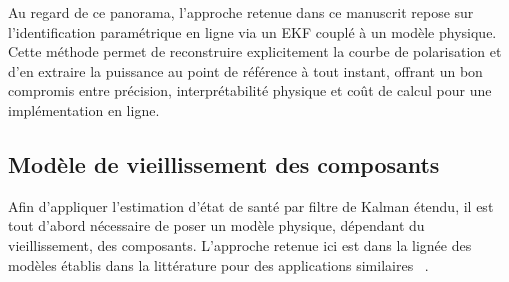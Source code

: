 Au regard de ce panorama, l'approche retenue dans ce manuscrit repose sur l'identification paramétrique en ligne via un EKF couplé à un modèle physique. Cette méthode permet de reconstruire explicitement la courbe de polarisation et d'en extraire la puissance au point de référence à tout instant, offrant un bon compromis entre précision, interprétabilité physique et coût de calcul pour une implémentation en ligne.


%

\subsection{Modèle de vieillissement des composants}
Afin d'appliquer l'estimation d'état de santé par filtre de Kalman étendu, il est tout d'abord nécessaire de poser un modèle physique, dépendant du vieillissement, des composants. L'approche retenue ici est dans la lignée des modèles établis dans la littérature pour des applications similaires ~\cite{bressel_extended_2016}\cite{abdin_modelling_2015}.


